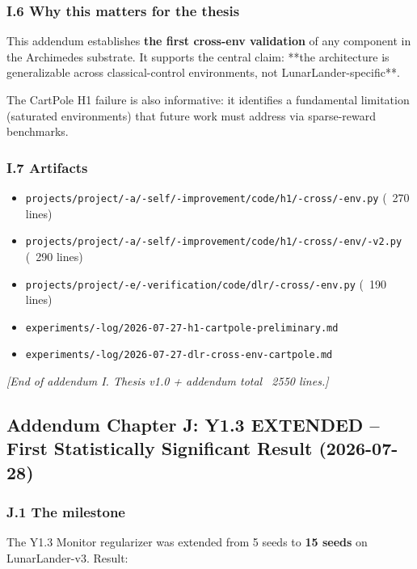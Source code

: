 \documentclass[11pt]{article}
\begin{document}
\subsubsection{I.6 Why this matters for the thesis}

This addendum establishes \textbf{the first cross-env validation} of any
component in the Archimedes substrate. It supports the central claim:
**the architecture is generalizable across classical-control environments,
not LunarLander-specific**.

The CartPole H1 failure is also informative: it identifies a fundamental
limitation (saturated environments) that future work must address via
sparse-reward benchmarks.

\subsubsection{I.7 Artifacts}

\begin{itemize}
  \item \texttt{projects/project/-a/-self/-improvement/code/h1/-cross/-env.py} (~270 lines)
  \item \texttt{projects/project/-a/-self/-improvement/code/h1/-cross/-env/-v2.py} (~290 lines)
  \item \texttt{projects/project/-e/-verification/code/dlr/-cross/-env.py} (~190 lines)
  \item \texttt{experiments/-log/2026-07-27-h1-cartpole-preliminary.md}
  \item \texttt{experiments/-log/2026-07-27-dlr-cross-env-cartpole.md}
\end{itemize}


\hrulefill

\textit{[End of addendum I. Thesis v1.0 + addendum total ~2550 lines.]}


\hrulefill

\subsection{Addendum Chapter J: Y1.3 EXTENDED --First Statistically Significant Result (2026-07-28)}

\subsubsection{J.1 The milestone}

The Y1.3 Monitor regularizer was extended from 5 seeds to \textbf{15 seeds} on
LunarLander-v3. Result:
\end{document}
